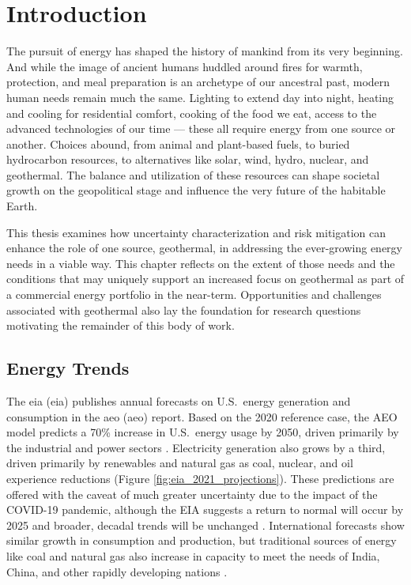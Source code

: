 \chapter{Introduction}\label{ch1:intro}
The pursuit of energy has shaped the history of mankind from its very beginning. And while the image of ancient humans huddled around fires for warmth, protection, and meal preparation is an archetype of our ancestral past, modern human needs remain much the same. Lighting to extend day into night, heating and cooling for residential comfort, cooking of the food we eat, access to the advanced technologies of our time --- these all require energy from one source or another. Choices abound, from animal and plant-based fuels, to buried hydrocarbon resources, to alternatives like solar, wind, hydro, nuclear, and geothermal. The balance and utilization of these resources can shape societal growth on the geopolitical stage and influence the very future of the habitable Earth.

This thesis examines how uncertainty characterization and risk mitigation can enhance the role of one source, geothermal, in addressing the ever-growing energy needs in a viable way. This chapter reflects on the extent of those needs and the conditions that may uniquely support an increased focus on geothermal as part of a commercial energy portfolio in the near-term. Opportunities and challenges associated with geothermal also lay the foundation for research questions motivating the remainder of this body of work.

\section{Energy Trends}\label{ch1:trends}
The \acrlong{eia} (\acrshort{eia}) publishes annual forecasts on U.S.\ energy generation and consumption in the \acrlong{aeo} (\acrshort{aeo}) report. Based on the 2020 reference case, the AEO model predicts a 70\% increase in U.S.\ energy usage by 2050, driven primarily by the industrial and power sectors \citep{us_energy_information_administration_annual_2021}. Electricity generation also grows by a third, driven primarily by renewables and natural gas as coal, nuclear, and oil experience reductions (Figure \ref{fig:eia_2021_projections}). These predictions are offered with the caveat of much greater uncertainty due to the impact of the COVID-19 pandemic, although the EIA suggests a return to normal will occur by 2025 and broader, decadal trends will be unchanged \citep{us_energy_information_administration_annual_2021}. International forecasts show similar growth in consumption and production, but traditional sources of energy like coal and natural gas also increase in capacity to meet the needs of India, China, and other rapidly developing nations \citep{us_energy_information_administration_international_2020}. 
 
